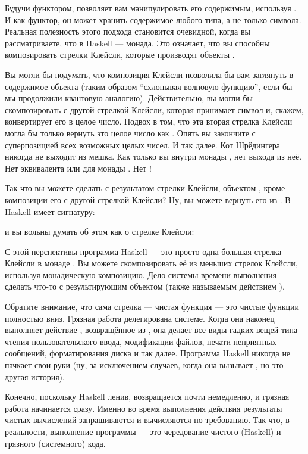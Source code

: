 Будучи функтором,  позволяет вам манипулировать его содержимым, используя
. И как функтор, он может хранить содержимое любого типа,
а не только символа. Реальная полезность этого подхода становится очевидной,
когда вы рассматриваете, что в Haskell  --- монада. Это означает,
что вы способны композировать стрелки Клейсли, которые производят объекты .

Вы могли бы подумать, что композиция Клейсли позволила бы вам заглянуть в
содержимое объекта  (таким образом ``схлопывая волновую
функцию'', если бы мы продолжили квантовую аналогию). Действительно, вы
могли бы скомпозировать  с другой стрелкой Клейсли, которая принимает
символ и, скажем, конвертирует его в целое число. Подвох в том, что эта
вторая стрелка Клейсли могла бы только вернуть это целое число как
. Опять вы закончите с суперпозицией всех
возможных целых чисел. И так далее. Кот Шрёдингера никогда не выходит из
мешка. Как только вы внутри монады , нет выхода из
неё. Нет эквивалента  или 
для монады . Нет !

Так что вы можете сделать с результатом стрелки Клейсли, объектом ,
кроме композиции его с другой стрелкой Клейсли? Ну, вы можете
вернуть его из . В Haskell  имеет
сигнатуру:

и вы вольны думать об этом как о стрелке Клейсли:

С этой перспективы программа Haskell --- это просто одна большая стрелка Клейсли
в монаде . Вы можете скомпозировать её из меньших стрелок Клейсли,
используя монадическую композицию. Дело системы времени выполнения --- сделать что-то
с результирующим объектом  (также называемым действием ).

Обратите внимание, что сама стрелка --- чистая функция --- это чистые функции
полностью вниз. Грязная работа делегирована системе. Когда она
наконец выполняет действие , возвращённое из , она
делает все виды гадких вещей типа чтения пользовательского ввода, модификации файлов,
печати неприятных сообщений, форматирования диска и так далее. Программа Haskell
никогда не пачкает свои руки (ну, за исключением случаев, когда она вызывает
, но это другая история).

Конечно, поскольку Haskell ленив,  возвращается почти
немедленно, и грязная работа начинается сразу. Именно во время
выполнения действия  результаты чистых
вычислений запрашиваются и вычисляются по требованию. Так что, в реальности,
выполнение программы --- это чередование чистого (Haskell) и грязного
(системного) кода.

